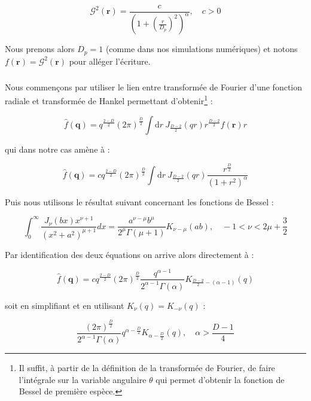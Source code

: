\begin{equation}
	\mathcal{G}^2(\mathbf{r}) = \frac{c}{\left(1+\left(\frac{r}{D_p}\right)^2\right)^\alpha}, \quad c > 0
\end{equation}

\noindent Nous prenons alors $D_p = 1$ (comme dans nos simulations numériques) et notons $f(\mathbf{r}) = \mathcal{G}^2(\mathbf{r})$ pour alléger l'écriture.

\subparagraph{}Nous commençons par utiliser le lien entre transformée de Fourier d'une fonction radiale et transformée de Hankel \cite{poularikas_transforms_2018} permettant d'obtenir\footnote{Il suffit, à partir de la définition de la transformée de Fourier, de faire l'intégrale sur la variable angulaire $\theta$ qui permet d'obtenir la fonction de Bessel de première espèce.} :

\begin{equation}
	\hat{f}(\mathbf{q}) = q^{\frac{2-D}{2}}(2\pi)^{\frac{D}{2}}\int\mathrm{d}r~J_{\frac{D-2}{2}}(qr)r^\frac{D-2}{2}f(\mathbf{r})r
\end{equation}

\noindent qui dans notre cas amène à : 

\begin{equation}
	\hat{f}(\mathbf{q}) = c q^{\frac{2-D}{2}}(2\pi)^{\frac{D}{2}}\int\mathrm{d}r~J_{\frac{D-2}{2}}(qr)\frac{r^\frac{D}{2}}{(1+r^2)^\alpha}
\end{equation}

\noindent Puis nous utilisons le résultat suivant concernant les fonctions de Bessel \cite{zwillinger_6_7_2014} :

\begin{equation}
\int_0^{\infty} \frac{J_\nu(b x) x^{\nu+1}}{\left(x^2+a^2\right)^{\mu+1}} d x=\frac{a^{\nu-\mu} b^\mu}{2^\mu \Gamma(\mu+1)} K_{\nu-\mu}(a b), \quad -1 < \nu < 2\mu + \frac{3}{2}
\end{equation}

\noindent Par identification des deux équations on arrive alors directement à :

\begin{equation}
	\hat{f}(\mathbf{q}) = c q^{\frac{2-D}{2}}(2\pi)^{\frac{D}{2}}\frac{q^{\alpha-1}}{2^{\alpha - 1}\Gamma(\alpha)}K_{\frac{D-2}{2}-(\alpha-1)}(q)
\end{equation}

\noindent soit en simplifiant et en utilisant $K_\nu (q) = K_{-\nu}(q)$ :

\begin{equation}
	\frac{(2\pi)^{\frac{D}{2}}}{2^{\alpha-1}\Gamma(\alpha)}q^{\alpha-\frac{D}{2}}K_{\alpha-\frac{D}{2}}(q), \quad \alpha > \frac{D-1}{4}
\end{equation}

